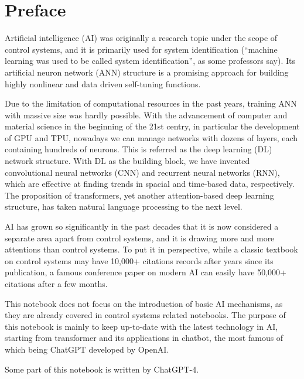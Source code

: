 \chapter*{Preface}

Artificial intelligence (AI) was originally a research topic under the scope of control systems, and it is primarily used for system identification (``machine learning was used to be called system identification'', as some professors say). Its artificial neuron network (ANN) structure is a promising approach for building highly nonlinear and data driven self-tuning functions.

Due to the limitation of computational resources in the past years, training ANN with massive size was hardly possible. With the advancement of computer and material science in the beginning of the 21st centry, in particular the development of GPU and TPU, nowadays we can manage networks with dozens of layers, each containing hundreds of neurons. This is referred as the deep learning (DL) network structure. With DL as the building block, we have invented convolutional neural networks (CNN) and recurrent neural networks (RNN), which are effective at finding trends in spacial and time-based data, respectively. The proposition of transformers, yet another attention-based deep learning structure, has taken natural language processing to the next level.

AI has grown so significantly in the past decades that it is now considered a separate area apart from control systems, and it is drawing more and more attentions than control systems. To put it in perspective, while a classic textbook on control systems may have 10,000+ citations records after years since its publication, a famous conference paper on modern AI can easily have 50,000+ citations after a few months.

This notebook does not focus on the introduction of basic AI mechanisms, as they are already covered in control systems related notebooks. The purpose of this notebook is mainly to keep up-to-date with the latest technology in AI, starting from transformer and its applications in chatbot, the most famous of which being ChatGPT developed by OpenAI.

Some part of this notebook is written by ChatGPT-4.